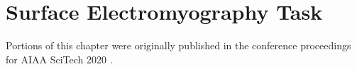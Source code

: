 \chapter{Surface Electromyography Task}
\label{chap:emg}

Portions of this chapter were originally published in the conference proceedings for AIAA SciTech 2020 \citep{doi:10.2514/6.2020-1110}.



